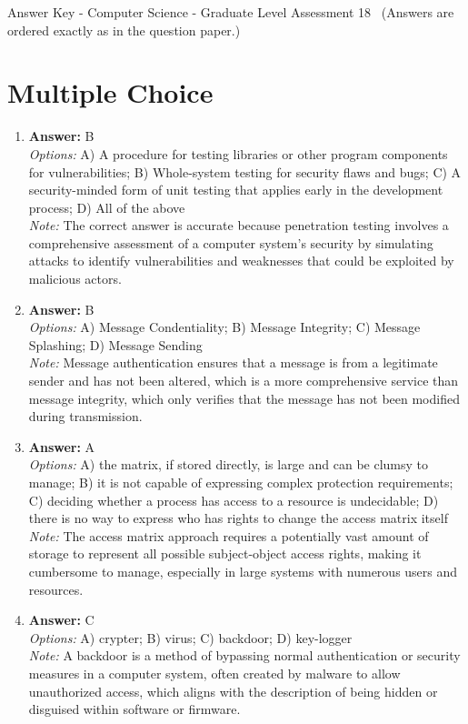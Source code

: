 \documentclass[12pt]{article}
\begin{document}
\begin{center}
Answer Key - Computer Science - Graduate Level Assessment 18 \
\small (Answers are ordered exactly as in the question paper.)
\end{center}

\section*{Multiple Choice}
\begin{enumerate}[label=\arabic*.]
\item \textbf{Answer:} B
\\ \textit{Options:} A) A procedure for testing libraries or other program components for vulnerabilities; B) Whole-system testing for security flaws and bugs; C) A security-minded form of unit testing that applies early in the development process; D) All of the above
\\ \textit{Note:} The correct answer is accurate because penetration testing involves a comprehensive assessment of a computer system's security by simulating attacks to identify vulnerabilities and weaknesses that could be exploited by malicious actors.
\item \textbf{Answer:} B
\\ \textit{Options:} A) Message Condentiality; B) Message Integrity; C) Message Splashing; D) Message Sending
\\ \textit{Note:} Message authentication ensures that a message is from a legitimate sender and has not been altered, which is a more comprehensive service than message integrity, which only verifies that the message has not been modified during transmission.
\item \textbf{Answer:} A
\\ \textit{Options:} A) the matrix, if stored directly, is large and can be clumsy to manage; B) it is not capable of expressing complex protection requirements; C) deciding whether a process has access to a resource is undecidable; D) there is no way to express who has rights to change the access matrix itself
\\ \textit{Note:} The access matrix approach requires a potentially vast amount of storage to represent all possible subject-object access rights, making it cumbersome to manage, especially in large systems with numerous users and resources.
\item \textbf{Answer:} C
\\ \textit{Options:} A) crypter; B) virus; C) backdoor; D) key-logger
\\ \textit{Note:} A backdoor is a method of bypassing normal authentication or security measures in a computer system, often created by malware to allow unauthorized access, which aligns with the description of being hidden or disguised within software or firmware.

\end{enumerate}
\end{document}

